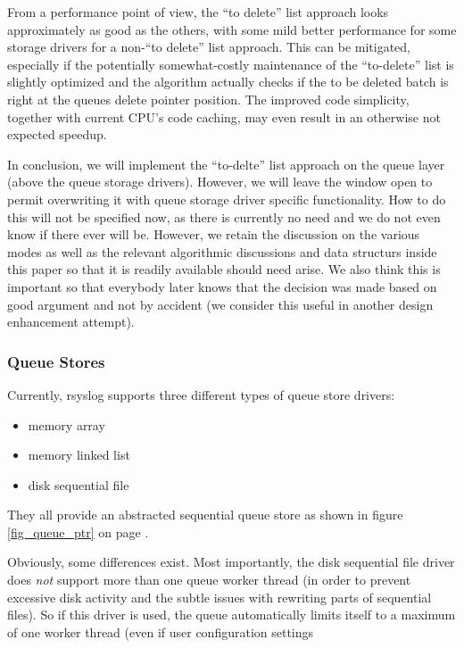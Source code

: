 \documentclass[a4paper,10pt]{article}
\begin{document}
From a performance point of view, the ``to delete'' list approach looks approximately as good as the others, with some mild better performance for some storage drivers for a non-``to delete'' list approach. This can be mitigated, especially if the potentially somewhat-costly maintenance of the ``to-delete'' list is slightly optimized and the algorithm actually checks if the to be deleted batch is right at the queues delete pointer position. The improved code simplicity, together with current CPU's code caching, may even result in an otherwise not expected speedup.

In conclusion, we will implement the ``to-delte'' list approach on the queue layer (above the queue storage drivers). However, we will leave the window open to permit overwriting it with queue storage driver specific functionality. How to do this will not be specified now, as there is currently no need and we do not even know if there ever will be. However, we retain the discussion on the various modes as well as the relevant algorithmic discussions and data structurs inside this paper so that it is readily available should need arise. We also think this is important so that everybody later knows that the decision was made based on good argument and not by accident (we consider this useful in another design enhancement attempt).


\subsubsection{Queue Stores}
Currently, rsyslog supports three different types of queue store drivers:

\begin{itemize}
\item memory array
\item memory linked list
\item disk sequential file
\end{itemize}

They all provide an abstracted sequential queue store as shown in figure \ref{fig_queue_ptr} on page \pageref{fig_queue_ptr}.

Obviously, some differences exist. Most importantly, the disk sequential file driver does \emph{not} support more than one queue worker thread (in order to prevent excessive disk activity and the subtle issues with rewriting parts of sequential files). So if this driver is used, the queue automatically limits itself to a maximum of one worker thread (even if user configuration settings 
\end{document}
